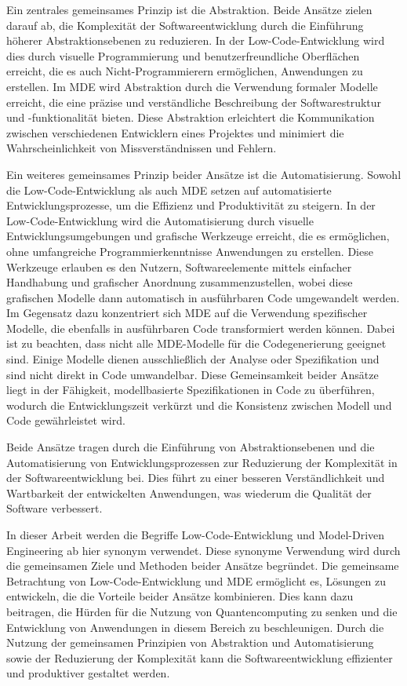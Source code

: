 Ein zentrales gemeinsames Prinzip ist die Abstraktion. Beide Ansätze zielen darauf ab, die Komplexität der Softwareentwicklung 
durch die Einführung höherer Abstraktionsebenen zu reduzieren. In der Low-Code-Entwicklung wird dies durch visuelle Programmierung 
und benutzerfreundliche Oberflächen erreicht, die es auch Nicht-Programmierern ermöglichen, Anwendungen zu erstellen. Im MDE 
wird Abstraktion durch die Verwendung formaler Modelle erreicht, die eine präzise und verständliche Beschreibung der 
Softwarestruktur und -funktionalität bieten. Diese Abstraktion erleichtert die Kommunikation zwischen verschiedenen 
Entwicklern eines Projektes und minimiert die Wahrscheinlichkeit von Missverständnissen und Fehlern.

Ein weiteres gemeinsames Prinzip beider Ansätze ist die Automatisierung. Sowohl die Low-Code-Entwicklung als auch  
MDE setzen auf automatisierte Entwicklungsprozesse, um die Effizienz und Produktivität zu steigern. In der Low-Code-Entwicklung 
wird die Automatisierung durch visuelle Entwicklungsumgebungen und grafische Werkzeuge erreicht, die es ermöglichen, ohne umfangreiche 
Programmierkenntnisse Anwendungen zu erstellen. Diese Werkzeuge erlauben es den Nutzern, Softwareelemente mittels einfacher Handhabung 
und grafischer Anordnung zusammenzustellen, wobei diese grafischen Modelle dann automatisch in ausführbaren Code umgewandelt werden. 
Im Gegensatz dazu konzentriert sich MDE auf die Verwendung spezifischer Modelle, die ebenfalls in ausführbaren Code transformiert werden 
können. Dabei ist zu beachten, dass nicht alle MDE-Modelle für die Codegenerierung geeignet sind. Einige Modelle dienen ausschließlich 
der Analyse oder Spezifikation und sind nicht direkt in Code umwandelbar. Diese Gemeinsamkeit beider Ansätze liegt in der Fähigkeit, 
modellbasierte Spezifikationen in Code zu überführen, wodurch die Entwicklungszeit verkürzt und die Konsistenz zwischen Modell und 
Code gewährleistet wird.

Beide Ansätze tragen durch die Einführung von Abstraktionsebenen und die Automatisierung von Entwicklungsprozessen zur Reduzierung 
der Komplexität in der Softwareentwicklung bei. Dies führt zu einer besseren Verständlichkeit und Wartbarkeit der entwickelten 
Anwendungen, was wiederum die Qualität der Software verbessert.

In dieser Arbeit werden die Begriffe Low-Code-Entwicklung und Model-Driven Engineering ab hier synonym verwendet. Diese synonyme Verwendung 
wird durch die gemeinsamen Ziele und Methoden beider Ansätze begründet. Die gemeinsame Betrachtung von Low-Code-Entwicklung und 
MDE ermöglicht es, Lösungen zu entwickeln, die die Vorteile beider Ansätze kombinieren. Dies kann dazu beitragen, die 
Hürden für die Nutzung von Quantencomputing zu senken und die Entwicklung 
von Anwendungen in diesem Bereich zu beschleunigen. Durch die Nutzung der gemeinsamen Prinzipien von Abstraktion und Automatisierung 
sowie der Reduzierung der Komplexität kann die Softwareentwicklung effizienter und produktiver gestaltet werden.

